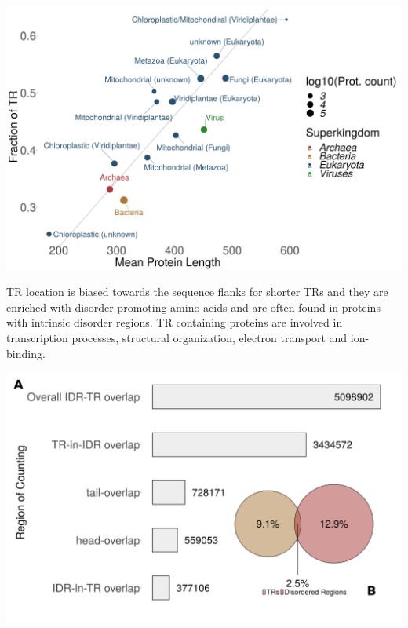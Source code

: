 \documentclass[widescreen,fleqn]{betterposter}
\begin{document}
{\begin{center}
    \includegraphics[width=0.4\textheight]{figures/Mean_Prot_length_vs_Frac_TR.png}
\end{center}
TR location is biased towards the sequence flanks for shorter TRs and they are enriched with disorder-promoting amino acids and are often found in proteins with intrinsic disorder regions.
TR containing proteins are involved in transcription processes, structural organization, electron transport
and ion-binding.

\begin{center}
    \includegraphics[width=0.4\textheight]{figures/TR_disorder_overlap_overall_detail_and_venn.png}
\end{center}

}
\end{document}
